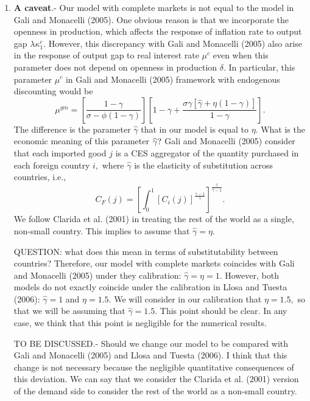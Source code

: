 \documentclass{article}
\begin{document}
\begin{enumerate}
\item \textbf{A caveat}.- Our model with complete markets is not equal to
the model in Gali and Monacelli (2005). One obvious reason is that we
incorporate the openness in production, which affects the response of
inflation rate to output gap $\lambda \kappa _{1}^{c}.$ However, this
discrepancy with Gali and Monacelli (2005) also arise in the response of
output gap to real interest rate $\mu ^{c}$ even when this parameter does
not depend on openness in production $\delta .$ In particular, this
parameter $\mu ^{c}$ in Gali and Monacelli (2005) framework with endogenous
discounting would be 
\begin{equation*}
\mu ^{gm}=\left[ \frac{1-\gamma }{\sigma -\phi \left( 1-\gamma \right) }%
\right] \left[ 1-\gamma +\frac{\sigma \gamma \left[ \widehat{\gamma }+\eta
\left( 1-\gamma \right) \right] }{1-\gamma }\right] .
\end{equation*}%
The difference is the parameter $\widehat{\gamma }$ that in our model is
equal to $\eta .$ What is the economic meaning of this parameter $\widehat{%
\gamma }?$ Gali and Monacelli (2005) consider that each imported good $j$ is
a CES aggregator of the quantity purchased in each foreign country $i,$
where $\widehat{\gamma }$ is the elasticity of substitution across
countries, i.e., 
\begin{equation*}
C_{F}(j)=\left[ \int_{0}^{1}\left[ C_{i}(j)\right] ^{\frac{\widehat{\gamma }%
-1}{\widehat{\gamma }}}\right] ^{\frac{\widehat{\gamma }}{\widehat{\gamma }-1%
}}.
\end{equation*}%
We follow Clarida et al. (2001) in treating the rest of the world as a
single, non-small country. This implies to assume that $\widehat{\gamma }%
=\eta .$

QUESTION: what does this mean in terms of substitutability between
countries? Therefore, our model with complete markets coincides with Gali
and Monacelli (2005) under they calibration: $\widehat{\gamma }=\eta =1.$
However, both models do not exactly coincide under the calibration in Llosa
and Tuesta (2006): $\widehat{\gamma }=1$ and $\eta =1.5.$ We will consider
in our calibration that $\eta =1.5,$ so that we will be assuming that $%
\widehat{\gamma }=1.5.$ This point should be clear. In any case, we think
that this point is negligible for the numerical results.

TO BE DISCUSSED.- Should we change our model to be compared with Gali and
Monacelli (2005) and Llosa and Tuesta (2006). I think that this change is
not necessary because the negligible quantitative consequences of this
deviation. We can say that we consider the Clarida et al. (2001) version of
the demand side to consider the rest of the world as a non-small country.
\end{enumerate}
\end{document}
